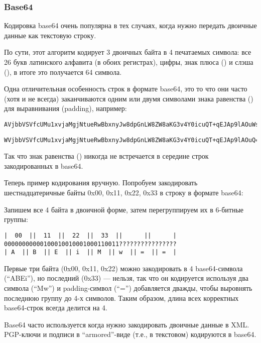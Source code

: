 \subsubsection{Base64}

Кодировка base64 очень популярна в тех случаях, когда нужно передать двоичные данные как текстовую строку.

По сути, этот алгоритм кодирует 3 двоичных байта в 4 печатаемых символа:
все 26 букв латинского алфавита (в обоих регистрах), цифры, знак плюса (\q{+}) и слэша (\q{/}),
в итоге это получается 64 символа.

Одна отличительная особенность строк в формате base64, это то что они часто (хотя и не всегда) заканчиваются
одним или двумя символами знака равенства (\q{=}) для выравнивания (\gls{padding}), например:

\begin{lstlisting}
AVjbbVSVfcUMu1xvjaMgjNtueRwBbxnyJw8dpGnLW8ZW8aKG3v4Y0icuQT+qEJAp9lAOuWs=
\end{lstlisting}

\begin{lstlisting}
WVjbbVSVfcUMu1xvjaMgjNtueRwBbxnyJw8dpGnLW8ZW8aKG3v4Y0icuQT+qEJAp9lAOuQ==
\end{lstlisting}

Так что знак равенства (\q{=}) никогда не встречается в середине строк закодированных в base64.

Теперь пример кодирования вручную.
Попробуем закодировать шестнадцатеричные байты 0x00, 0x11, 0x22, 0x33 в строку в формате base64:



Запишем все 4 байта в двоичной форме, затем перегруппируем их в 6-битные группы:

\begin{lstlisting}
|  00  ||  11  ||  22  ||  33  ||      ||      |
00000000000100010010001000110011????????????????
| A  || B  || E  || i  || M  || w  || =  || =  |
\end{lstlisting}

Первые три байта (0x00, 0x11, 0x22) можно закодировать в 4 base64-символа (``ABEi''),
но последний (0x33) --- нельзя,
так что он кодируется используя два символа (``Mw'') и \gls{padding}-символ (``='')
добавляется дважды, чтобы выровнять последнюю группу до 4-х символов.
Таким образом, длина всех корректных base64-строк всегда делится на 4.

Base64 часто используется когда нужно закодировать двоичные данные в XML.
PGP-ключи и подписи в ``armored''-виде (т.е., в текстовом) кодируются в base64.

